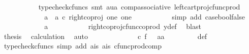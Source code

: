 \begin{isabellebody}
\ \ \ \ \ \ \ \ \ \isamarkupfalse%
\ {\isacharparenleft}{\kern0pt}typecheck{\isacharunderscore}{\kern0pt}cfuncs{\isacharcomma}{\kern0pt}\ smt\ aua\ comp{\isacharunderscore}{\kern0pt}associative{}\ left{\isacharunderscore}{\kern0pt}cart{\isacharunderscore}{\kern0pt}proj{\isacharunderscore}{\kern0pt}cfunc{\isacharunderscore}{\kern0pt}prod{\isacharparenright}{\kern0pt}\isanewline
\ \ \ \ \ \ \ \isamarkupfalse%
\ \isamarkupfalse%
\ {\isachardoublequoteopen}{\isachardot}{\kern0pt}{\isachardot}{\kern0pt}{\isachardot}{\kern0pt}\ {\isacharequal}{\kern0pt}\ {\isacharparenleft}{\kern0pt}a{}\ {\isasymamalg}\ a{}{\isacharparenright}{\kern0pt}\ {\isasymcirc}\isactrlsub c\ right{\isacharunderscore}{\kern0pt}coproj\ one\ one{\isachardoublequoteclose}\isanewline
\ \ \ \ \ \ \ \ \ \isamarkupfalse%
\ {\isacharparenleft}{\kern0pt}simp\ add{\isacharcolon}{\kern0pt}\ case{\isacharunderscore}{\kern0pt}bool{\isacharunderscore}{\kern0pt}false{\isacharparenright}{\kern0pt}\isanewline
\ \ \ \ \ \ \ \isamarkupfalse%
\ \isamarkupfalse%
\ {\isachardoublequoteopen}{\isachardot}{\kern0pt}{\isachardot}{\kern0pt}{\isachardot}{\kern0pt}\ {\isacharequal}{\kern0pt}\ a{}{\isachardoublequoteclose}\isanewline
\ \ \ \ \ \ \ \ \ \isamarkupfalse%
\ right{\isacharunderscore}{\kern0pt}coproj{\isacharunderscore}{\kern0pt}cfunc{\isacharunderscore}{\kern0pt}coprod\ y{\isacharunderscore}{\kern0pt}def\ \isamarkupfalse%
\ blast\isanewline
\ \ \ \ \ \ \ \isamarkupfalse%
\ \isamarkupfalse%
\ {\isacharquery}{\kern0pt}thesis\ \isamarkupfalse%
\ calculation\ \isamarkupfalse%
\ auto\isanewline
\ \ \ \ \ \isamarkupfalse%
\isanewline
\ \ \ \ \ \isamarkupfalse%
\ {\isachardoublequoteopen}{\isasymphi}\ {\isasymcirc}\isactrlsub c\ f\ \ {\isacharequal}{\kern0pt}\ {\isasymlangle}a{}{\isacharcomma}{\kern0pt}a{}{\isasymrangle}{\isachardoublequoteclose}\isanewline
\ \ \ \ \ \ \ \isamarkupfalse%
\ {\isasymphi}{\isacharunderscore}{\kern0pt}def\ \isamarkupfalse%
\ {\isacharparenleft}{\kern0pt}typecheck{\isacharunderscore}{\kern0pt}cfuncs{\isacharcomma}{\kern0pt}\ simp\ add{\isacharcolon}{\kern0pt}\ a{}{\isacharunderscore}{\kern0pt}is\ a{}{\isacharunderscore}{\kern0pt}is\ cfunc{\isacharunderscore}{\kern0pt}prod{\isacharunderscore}{\kern0pt}comp{\isacharparenright}{\kern0pt}\isanewline

\end{isabellebody}
